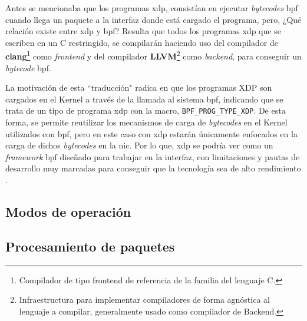 Antes se mencionaba que los programas \gls{xdp}, consistían en ejecutar \textit{bytecodes} \gls{bpf} cuando llega un paquete a la interfaz donde está cargado el programa, pero, ¿Qué relación existe entre \gls{xdp} y \gls{bpf}? Resulta que todos los programas \gls{xdp} que se escriben en un C restringido, se compilarán haciendo uso del compilador de \textbf{clang}\footnote{Compilador de tipo frontend de referencia de la familia del lenguaje C.} como \textit{frontend} y del compilador \textbf{LLVM}\footnote{Infraestructura para implementar compiladores de forma agnóstica al lenguaje a compilar, generalmente usado como compilador de Backend.} como \textit{backend}, para conseguir un \textit{bytecode} \gls{bpf}.\\
\par

La motivación de esta ``traducción" radica en  que los programas XDP son cargados en el Kernel a través de la llamada al sistema \gls{bpf}, indicando que se trata de un tipo de programa \gls{xdp} con la macro, \texttt{BPF\_PROG\_TYPE\_XDP}. De esta forma, se permite reutilizar los mecanismos de carga de \textit{bytecodes} en el Kernel utilizados con \gls{bpf}, pero en este caso con \gls{xdp} estarán únicamente enfocados en la carga de dichos \textit{bytecodes} en la \gls{nic}. Por lo que, \gls{xdp} se podría ver como un \textit{framework} \gls{bpf} diseñado para trabajar en la interfaz, con limitaciones y pautas de desarrollo muy marcadas para conseguir que la tecnología sea de alto rendimiento \cite{xdp1}.\\
\newpage

\subsection{Modos de operación}



\subsection{Procesamiento de paquetes}

